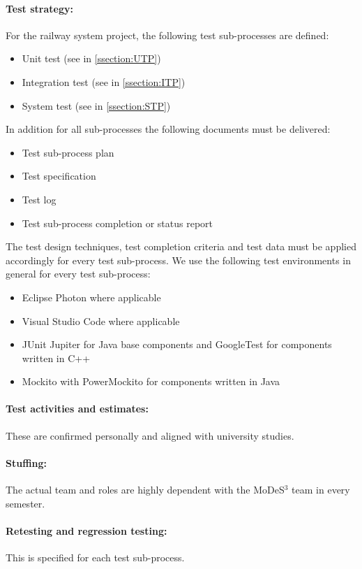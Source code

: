 \paragraph{Test strategy:} 
For the railway system project, the following test sub-processes are defined:
\begin{itemize}
	\item Unit test (see in \autoref{ssection:UTP})
	\item Integration test (see in \autoref{ssection:ITP})
	\item System test (see in \autoref{ssection:STP})
\end{itemize}
In addition for all sub-processes the following documents must be delivered:
\begin{itemize}
	\item Test sub-process plan
	\item Test specification
	\item Test log
	\item Test sub-process completion or status report
\end{itemize}
The test design techniques, test completion criteria and test data must be applied accordingly for every test sub-process. We use the following test environments in general for every test sub-process:
\begin{itemize}
	\item Eclipse Photon where applicable
	\item Visual Studio Code where applicable
	\item JUnit Jupiter for Java base components and GoogleTest for components written in C++
	\item Mockito with PowerMockito for components written in Java
\end{itemize}
\paragraph{Test activities and estimates:} These are confirmed personally and aligned with university studies.
\paragraph{Stuffing:} The actual team and roles are highly dependent with the MoDeS$^3$ team in every semester.
\paragraph{Retesting and regression testing:} This is specified for each test sub-process.

